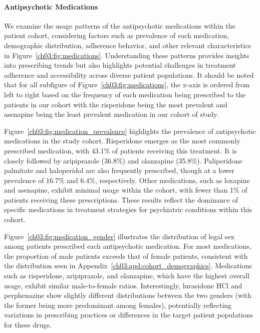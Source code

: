 


\paragraph{Antipsychotic Medications}
\label{ch03:adp:cohort_medications}





We examine the usage patterns of the antipsychotic medications within the patient cohort, considering factors such as prevalence of each medication, demographic distribution, adherence behavior, and other relevant characteristics in Figure~\ref{ch03:fig:medications}. 
Understanding these patterns provides insights into prescribing trends but also highlights potential challenges in treatment adherence and accessibility across diverse patient populations.
It should be noted that for all subfigure of Figure~\ref{ch03:fig:medications}, the x-axis is ordered from left to right based on the frequency of each medication being prescribed to the patients in our cohort with the risperidone being the most prevalent and asenapine being the least prevalent medication in our cohort of study.

Figure~\ref{ch03:fig:medication_prevalence} highlights the prevalence of antipsychotic medications in the study cohort. 
Risperidone emerges as the most commonly prescribed medication, with 43.1\% of patients receiving this treatment. 
It is closely followed by aripiprazole (36.8\%) and olanzapine (35.8\%). 
Paliperidone palmitate and haloperidol are also frequently prescribed, though at a lower prevalence of 16.7\% and 6.4\%, respectively. 
Other medications, such as loxapine and asenapine, exhibit minimal usage within the cohort, with fewer than 1\% of patients receiving these prescriptions. 
These results reflect the dominance of specific medications in treatment strategies for psychiatric conditions within this cohort.

Figure~\ref{ch03:fig:medication_gender} illustrates the distribution of legal sex among patients prescribed each antipsychotic medication. 
For most medications, the proportion of male patients exceeds that of female patients, consistent with the distribution seen in Appendix~\ref{ch03:apd:cohort_demographics}. 
Medications such as risperidone, aripiprazole, and olanzapine, which have the highest overall usage, exhibit similar male-to-female ratios. 
Interestingly, lurasidone HCl and perphenazine show slightly different distributions between the two genders (with the former being more predominant among females), potentially reflecting variations in prescribing practices or differences in the target patient populations for these drugs.

